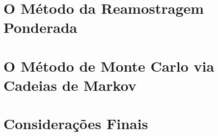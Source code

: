 \documentclass[12pt,reqno,a4paper,oneside]{article}
\begin{document}

\section{\Large O Método da Reamostragem Ponderada}\label{sir}


\section{\Large O Método de Monte Carlo via Cadeias de Markov}\label{mcmc}


\section{Considerações Finais}\label{consfin}




\end{document}
